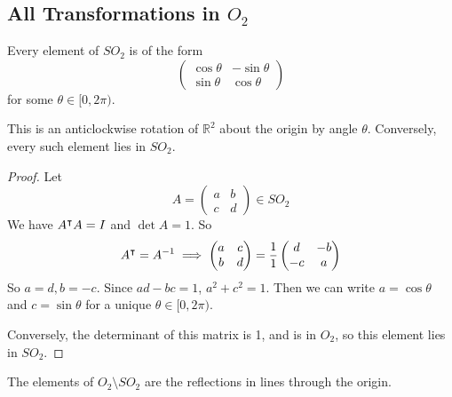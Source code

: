 \subsection{All Transformations in \(O_2\)}
\begin{theorem}
	Every element of \(SO_2\) is of the form
	\[
		\begin{pmatrix}
			\cos\theta & -\sin\theta \\
			\sin\theta & \cos\theta
		\end{pmatrix}
	\]
	for some \(\theta \in [0, 2\pi)\).

	This is an anticlockwise rotation of \(\mathbb R^2\) about the origin by angle \(\theta\).
	Conversely, every such element lies in \(SO_2\).
\end{theorem}
\begin{proof}
	Let
	\[
		A = \begin{pmatrix}
			a & b \\ c & d
		\end{pmatrix} \in SO_2
	\]
	We have \(A^\intercal A = I\) and \(\det A = 1\).
	So
	\[
		A^\intercal = A^{-1} \implies \begin{pmatrix}
			a & c \\ b & d
		\end{pmatrix} = \frac{1}{1} \begin{pmatrix}
			d & -b \\ -c & a
		\end{pmatrix}
	\]
	So \(a=d, b=-c\).
	Since \(ad-bc=1\), \(a^2+c^2=1\).
	Then we can write \(a = \cos \theta\) and \(c = \sin \theta\) for a unique \(\theta \in [0, 2\pi)\).

	Conversely, the determinant of this matrix is 1, and is in \(O_2\), so this element lies in \(SO_2\).
\end{proof}
\begin{theorem}
	The elements of \(O_2 \setminus SO_2\) are the reflections in lines through the origin.
\end{theorem}
